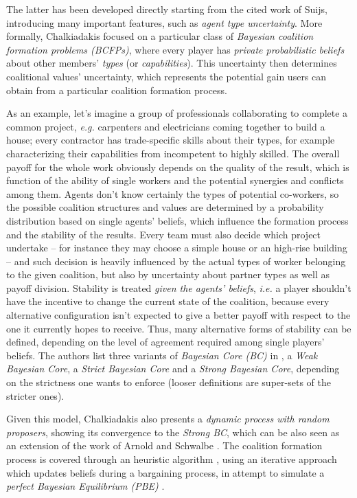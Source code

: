 \documentclass[11pt, twoside, titlepage, a4paper, openright]{report}
\begin{document}
The latter has been developed directly starting from the cited work of Suijs, introducing many important features, such as \textit{agent type uncertainty}. More formally, Chalkiadakis focused on a particular class of \textit{Bayesian coalition formation problems (BCFPs)}, where every player has \textit{private probabilistic beliefs} about other members' \textit{types} (or \textit{capabilities}). This uncertainty then determines coalitional values' uncertainty, which represents the potential gain users can obtain from a particular coalition formation process.

As an example, let's imagine a group of professionals collaborating to complete a common project, \textit{e.g.} carpenters and electricians coming together to build a house; every contractor has trade-specific skills about their types, for example characterizing their capabilities from incompetent to highly skilled.
The overall payoff for the whole work obviously depends on the quality of the result, which is function of the ability of single workers and the potential synergies and conflicts among them. Agents don't know certainly the types of potential co-workers, so the possible coalition structures and values are determined by a probability distribution based on single agents' beliefs, which influence the formation process and the stability of the results.
Every team must also decide which project undertake -- for instance they may choose a simple house or an high-rise building -- and such decision is heavily influenced by the actual types of worker belonging to the given coalition, but also by uncertainty about partner types as well as payoff division.
Stability is treated \textit{given the agents' beliefs}, \textit{i.e.} a player shouldn't have the incentive to change the current state of the coalition, because every alternative configuration isn't expected to give a better payoff with respect to the one it currently hopes to receive.
Thus, many alternative forms of stability can be defined, depending on the level of agreement required among single players' beliefs. The authors list three variants of \textit{Bayesian Core (BC)} in \cite{Chalkiadakis:2007:BAM:1467514}, a \textit{Weak Bayesian Core}, a \textit{Strict Bayesian Core} and a \textit{Strong Bayesian Core}, depending on the strictness one wants to enforce (looser definitions are super-sets of the stricter ones).

Given this model, Chalkiadakis \cite{Chalkiadakis:2007:BAM:1467514,DBLP:conf/atal/ChalkiadakisB04} also presents a \textit{dynamic process with random proposers}, showing its convergence to the \textit{Strong BC}, which can be also seen as an extension of the work of Arnold and Schwalbe \cite{Arnold_Schwalbe_2002}. The coalition formation process is covered through an heuristic algorithm \cite{Chalkiadakis:2007:BAM:1467514,DBLP:conf/ijcai/ChalkiadakisB07}, using an iterative approach which updates beliefs during a bargaining process, in attempt to simulate a \textit{perfect Bayesian Equilibrium (PBE)} \cite{mas1995microeconomic}.
\end{document}

